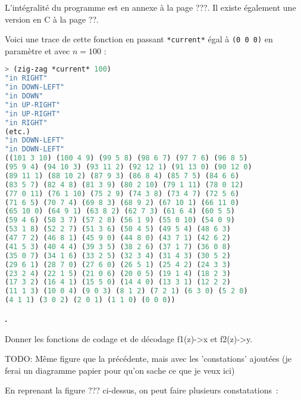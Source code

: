 \documentclass{article}
\newcounter{enoncecount}
\newenvironment{enonce}
{
\stepcounter{enoncecount}
\bf\small \arabic{enoncecount}.
\begin{bf}
}
{
\end{bf}
}
\begin{document}

L'intégralité du programme est en annexe à la page ???. Il existe également une version en C à la page ??.

Voici une trace de cette fonction en passant \lstinline!*current*! égal à \lstinline!(0 0 0)! en paramètre et avec $n = 100$ :

\begin{lstlisting}[language=Lisp]
> (zig-zag *current* 100)
"in RIGHT" 
"in DOWN-LEFT" 
"in DOWN" 
"in UP-RIGHT" 
"in UP-RIGHT" 
"in RIGHT" 
(etc.)
"in DOWN-LEFT" 
"in DOWN-LEFT" 
((101 3 10) (100 4 9) (99 5 8) (98 6 7) (97 7 6) (96 8 5) 
(95 9 4) (94 10 3) (93 11 2) (92 12 1) (91 13 0) (90 12 0) 
(89 11 1) (88 10 2) (87 9 3) (86 8 4) (85 7 5) (84 6 6) 
(83 5 7) (82 4 8) (81 3 9) (80 2 10) (79 1 11) (78 0 12) 
(77 0 11) (76 1 10) (75 2 9) (74 3 8) (73 4 7) (72 5 6) 
(71 6 5) (70 7 4) (69 8 3) (68 9 2) (67 10 1) (66 11 0) 
(65 10 0) (64 9 1) (63 8 2) (62 7 3) (61 6 4) (60 5 5) 
(59 4 6) (58 3 7) (57 2 8) (56 1 9) (55 0 10) (54 0 9) 
(53 1 8) (52 2 7) (51 3 6) (50 4 5) (49 5 4) (48 6 3) 
(47 7 2) (46 8 1) (45 9 0) (44 8 0) (43 7 1) (42 6 2) 
(41 5 3) (40 4 4) (39 3 5) (38 2 6) (37 1 7) (36 0 8) 
(35 0 7) (34 1 6) (33 2 5) (32 3 4) (31 4 3) (30 5 2) 
(29 6 1) (28 7 0) (27 6 0) (26 5 1) (25 4 2) (24 3 3) 
(23 2 4) (22 1 5) (21 0 6) (20 0 5) (19 1 4) (18 2 3) 
(17 3 2) (16 4 1) (15 5 0) (14 4 0) (13 3 1) (12 2 2) 
(11 1 3) (10 0 4) (9 0 3) (8 1 2) (7 2 1) (6 3 0) (5 2 0) 
(4 1 1) (3 0 2) (2 0 1) (1 1 0) (0 0 0))
\end{lstlisting}


\begin{enonce}
Donner les fonctions de codage et de décodage f1(z)->x et f2(z)->y.
\end{enonce}

TODO: Même figure que la précédente, mais avec les 'constations' ajoutées (je ferai un diagramme papier pour qu'on sache ce que je veux ici)

En reprenant la figure ??? ci-dessus, on peut faire plusieurs constatations~:
\end{document}
